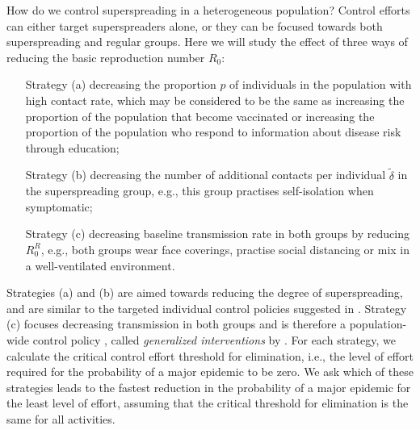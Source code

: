 \documentclass{imammb}
\numberwithin{equation}{section}
\begin{document}

How do we control superspreading in a heterogeneous population? Control efforts can either target superspreaders alone, or they can be focused towards both superspreading and regular groups. Here we will study the effect of three ways of reducing the basic reproduction number $R_0$:
\begin{itemize}
\item[Strategy (a)] decreasing the proportion $p$ of individuals in the population with high contact rate, which may
be considered to be the same as increasing the proportion of the population that become vaccinated or increasing the proportion of the population who respond to information about disease risk through education; %
\item [Strategy (b)] decreasing the number of additional contacts per individual $\tilde{\delta}$ in the superspreading group, e.g., this group practises self-isolation when symptomatic;
\item [Strategy (c)] decreasing baseline transmission rate in both groups by reducing $R_0^R$, e.g., both groups wear face coverings, practise social distancing or mix in a well-ventilated environment. 
\end{itemize}
Strategies (a) and (b) are aimed towards reducing the degree of superspreading, and are similar to the targeted individual control policies suggested in \citet{Lloyd-Smith2005-ma}. Strategy (c) focuses decreasing transmission in both groups and is therefore a population-wide control policy \citep{Lloyd-Smith2005-ma}, called \textit{generalized interventions} by \citet{Drake2021-vi}. For each strategy, we calculate the critical control effort threshold for elimination, i.e., the level of effort required for the probability of a major epidemic to be zero. We ask which of these strategies leads to the fastest reduction in the probability of a major epidemic for the least level of effort, assuming that the critical threshold for elimination is the same for all activities. 
\end{document}
